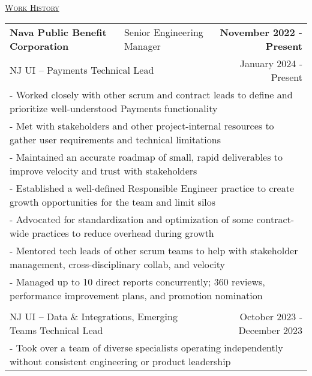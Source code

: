 \documentclass[letterpaper]{article}
\begin{document}
	\begin{center}
		\vspace{0.0in}
		\underline{\large \scshape Work History}
		\begin{tabular}{p{}p{}r}
			  \textbf{Nava Public Benefit Corporation} &
			  \quad\quad\quad Senior Engineering Manager &
			  \textbf{November 2022 - Present\quad}

			  \\
			  \multicolumn{2}{p{0.5\textwidth}}{\quad NJ UI -- Payments Technical Lead}
			  &
			  {January 2024 - Present \quad\quad\quad\quad}
		  \\
			  \multicolumn{3}{p{\textwidth}}{\quad\quad - Worked closely with other scrum and contract leads to define and prioritize well-understood Payments functionality} \\
			  \multicolumn{3}{p{\textwidth}}{\quad\quad - Met with stakeholders and other project-internal resources to gather user requirements and technical limitations} \\
			  \multicolumn{3}{p{\textwidth}}{\quad\quad - Maintained an accurate roadmap of small, rapid deliverables to improve velocity and trust with stakeholders} \\
			  \multicolumn{3}{p{\textwidth}}{\quad\quad - Established a well-defined Responsible Engineer practice to create growth opportunities for the team and limit silos} \\
			  \multicolumn{3}{p{\textwidth}}{\quad\quad - Advocated for standardization and optimization of some contract-wide practices to reduce overhead during growth} \\
			  \multicolumn{3}{p{\textwidth}}{\quad\quad - Mentored tech leads of other scrum teams to help with stakeholder management, cross-disciplinary collab, and velocity } \\
			  \multicolumn{3}{p{\textwidth}}{\quad\quad - Managed up to 10 direct reports concurrently; 360 reviews, performance improvement plans, and promotion nomination }
		  \\
		  \\
			  \multicolumn{2}{p{0.5\textwidth}}{\quad NJ UI -- Data \& Integrations, Emerging Teams Technical Lead}
			  &
			  {October 2023 - December 2023 \quad\quad\quad\quad}
		  \\
			  \multicolumn{3}{p{\textwidth}}{\quad\quad - Took over a team of diverse specialists operating independently without consistent engineering or product leadership} \\

\end{tabular}
\end{center}
\end{document}

